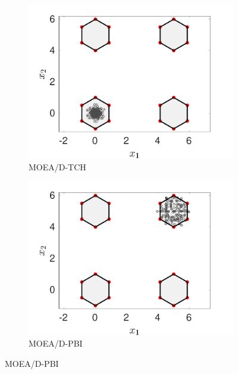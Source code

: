 \documentclass[conference]{IEEEtran}
\begin{document}
\begin{figure}[htbp]
    \begin{subfigure}[b]{.22\textwidth}
    \includegraphics[width=\linewidth]{Section5/dim4/PS/MOEAD_TCH}
    \caption{MOEA/D-TCH}
    \end{subfigure}
    \begin{subfigure}[b]{.22\textwidth}
    \includegraphics[width=\linewidth]{Section5/dim4/PS/MOEAD_PBI}
    \caption{MOEA/D-PBI}
    \end{subfigure}
    

\end{figure}
\end{document}
